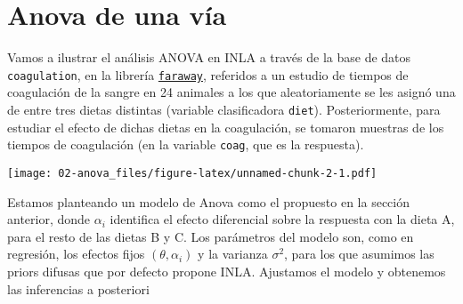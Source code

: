 \documentclass[
]{book}
\newenvironment{Shaded}{\begin{snugshade}}{\end{snugshade}}
\newcommand{\AttributeTok}[1]{\textcolor[rgb]{0.77,0.63,0.00}{#1}}
\newcommand{\CommentTok}[1]{\textcolor[rgb]{0.56,0.35,0.01}{\textit{#1}}}
\newcommand{\FunctionTok}[1]{\textcolor[rgb]{0.00,0.00,0.00}{#1}}
\newcommand{\NormalTok}[1]{#1}
\newcommand{\SpecialCharTok}[1]{\textcolor[rgb]{0.00,0.00,0.00}{#1}}
\newcommand{\StringTok}[1]{\textcolor[rgb]{0.31,0.60,0.02}{#1}}
\begin{document}
\hypertarget{anova-de-una-vuxeda}{%
\section{Anova de una vía}\label{anova-de-una-vuxeda}}

Vamos a ilustrar el análisis ANOVA en INLA a través de la base de datos \texttt{coagulation}, en la librería \href{https://cran.r-project.org/web/packages/faraway/faraway.pdf}{\texttt{faraway}}, referidos a un estudio de tiempos de coagulación de la sangre en 24 animales a los que aleatoriamente se les asignó una de entre tres dietas distintas (variable clasificadora \texttt{diet}). Posteriormente, para estudiar el efecto de dichas dietas en la coagulación, se tomaron muestras de los tiempos de coagulación (en la variable \texttt{coag}, que es la respuesta).

\begin{Shaded}
\end{Shaded}

\texttt{[image: 02-anova\_files/figure-latex/unnamed-chunk-2-1.pdf]}

Estamos planteando un modelo de Anova como el propuesto en la sección anterior, donde \(\alpha_i\) identifica el efecto diferencial sobre la respuesta con la dieta A, para el resto de las dietas B y C. Los parámetros del modelo son, como en regresión, los efectos fijos \((\theta,\alpha_i)\) y la varianza \(\sigma^2\), para los que asumimos las priors difusas que por defecto propone INLA. Ajustamos el modelo y obtenemos las inferencias a posteriori
\end{document}
